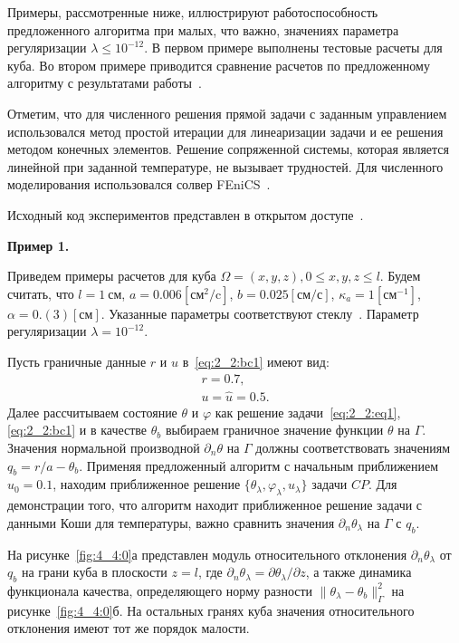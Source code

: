 Примеры, рассмотренные ниже, иллюстрируют работоспособность предложенного алгоритма при
малых, что важно, значениях параметра регуляризации $\lambda \leq 10^{-12}$.
В первом примере выполнены тестовые расчеты для куба.
Во втором примере приводится сравнение расчетов по
предложенному алгоритму с результатами работы~\cite{Chebotarev2019Problem}.

Отметим, что для численного решения прямой задачи с заданным управлением использовался
метод простой итерации для линеаризации задачи и ее решения методом конечных элементов.
Решение сопряженной системы, которая является линейной при заданной температуре,
не вызывает трудностей.
Для численного моделирования использовался солвер FEniCS~\cite{fenics, dolfin}.

Исходный код экспериментов представлен в открытом доступе~\cite{mesenev-github}.

\textbf{Пример 1.}

Приведем примеры расчетов для куба $\Omega = {(x, y, z), 0 \leq x,y,z \leq l}$.
Будем считать, что $l=1~\text{см}$, $a = 0.006[\text{см}^2/\text{c}]$,
$b=0.025[\text{см}/\text{с}]$, $\kappa_a=1[\text{см}^{-1}]$, $\alpha = 0.(3)[\text{см}]$.
Указанные параметры соответствуют стеклу~\cite{Grenkin2016a}.
Параметр регуляризации $\lambda=10^{-12}.$

Пусть граничные данные $r$ и $u$ в~\eqref{eq:2_2:bc1} имеют вид:
\begin{gather*}
    r = 0.7,\\
    u = \hat u = 0.5.
\end{gather*}
Далее рассчитываем состояние $\theta$ и $\varphi$ как решение
задачи~\eqref{eq:2_2:eq1},\eqref{eq:2_2:bc1} и в качестве $\theta_b$
выбираем граничное значение функции $\theta$ на $\Gamma$.
Значения нормальной производной $\partial_n\theta$ на $\Gamma$
должны соответствовать значениям $q_b=r/a-\theta_b$.
Применяя предложенный алгоритм с начальным приближением $u_0 = 0.1$,
находим приближенное решение $\{\theta_\lambda, \varphi_\lambda, u_\lambda\}$ задачи $CP$.
Для демонстрации того, что алгоритм находит приближенное решение задачи с данными
Коши для температуры, важно сравнить значения $\partial_n\theta_\lambda$ на $\Gamma$ с $q_b.$

На рисунке~\ref{fig:4_4:0}а представлен модуль относительного
отклонения $\partial_n\theta_\lambda$ от $q_b$ на грани куба в плоскости $z=l$,
где $\partial_n\theta_\lambda=\partial\theta_\lambda/\partial z$,
а также динамика функционала качества, определяющего норму
разности $\|\theta_\lambda -\theta_b\|^2_\Gamma$ на рисунке~\ref{fig:4_4:0}б.
На остальных гранях куба значения относительного
отклонения имеют тот же порядок малости.

